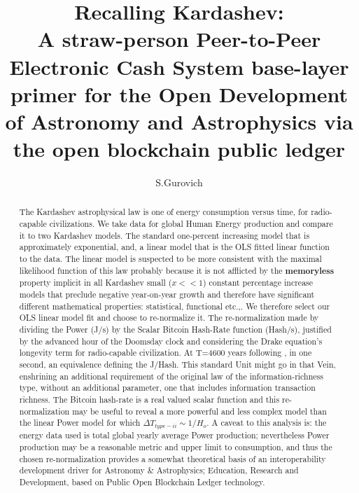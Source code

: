 \documentclass[final,5p,times,twocolumn,authoryear]{elsarticle}
\begin{document}
\begin{frontmatter}

\title{ Recalling Kardashev:\\ A straw-person Peer-to-Peer Electronic Cash System base-layer primer for the Open Development of Astronomy and Astrophysics via the open blockchain public ledger}
 
    \author[iate,wsu]{S.Gurovich}
  
\address[iate]{
   Instituto De Astronom\'ia Te\'orica y Experimental -
   Observatorio Astron\'omico C\'ordoba (IATE--OAC--UNC--CONICET),
   Laprida 854, X5000BGR, C\'ordoba, Argentina}
\address[wsu]{
   Western Sydney University, Kingswood campus, NSW, Australia
}

\begin{abstract}

The Kardashev astrophysical law is one of energy consumption versus time, for radio-capable civilizations. We take data for global Human Energy production and compare it to two Kardashev models. The standard one-percent increasing model that is approximately exponential, and, a linear model that is the  OLS fitted linear function to the data. The linear model is suspected to be more consistent with the maximal likelihood function of this law probably because it is not afflicted by the \textbf{memoryless} property implicit in all Kardashev small ($x<<1$) constant percentage increase models that preclude negative year-on-year growth and therefore have significant different mathematical properties: statistical, functional etc.,. We therefore select our OLS linear model fit and choose to re-normalize it. The re-normalization made by dividing the Power (J/s) by the Scalar Bitcoin Hash-Rate function (Hash/s), justified by the advanced hour of the Doomsday clock and considering the Drake equation's longevity term for radio-capable civilization. At T=4600 years following \cite{kar64}, in one second, an equivalence defining the J/Hash. This standard Unit might go in that Vein, enshrining an additional requirement of the original law of the information-richness type, without an additional parameter, one that includes information transaction richness. The Bitcoin hash-rate is a real valued scalar function and this re-normalization may be useful to reveal a more powerful and less complex model than the linear Power model for which $\Delta T_{type-ii} \sim {1/H_o}$. A caveat to this analysis is: the energy data used is total global yearly average Power production; nevertheless Power production may be a reasonable metric and upper limit to consumption, and thus the chosen re-normalization provides a somewhat theoretical basis of an interoperability development driver for Astronomy \& Astrophysics; Education, Research and Development, based on Public Open Blockchain Ledger technology. 


\end{abstract}
\end{frontmatter}
\end{document}
